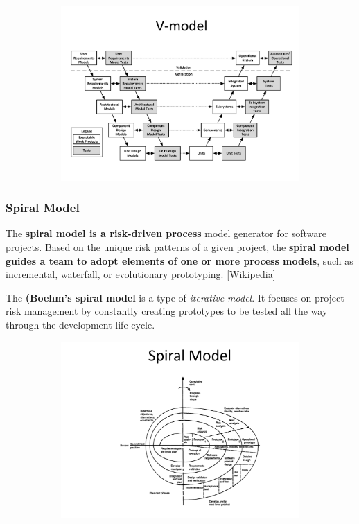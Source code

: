 \documentclass[a4paper]{article}
\begin{document}
\begin{figure}[H]
\hskip-2.5cm\begin{subfigure}{1.2\textwidth}
  \includegraphics[width=1.2\linewidth]
  {images/3-v-model.png}
\end{subfigure}
\end{figure}

\subsubsection{Spiral Model}
The \textbf{spiral model is a risk-driven process} model generator for software projects. Based on the unique risk patterns of a given project, the \textbf{spiral model guides a team to adopt elements of one or more process models}, such as incremental, waterfall, or evolutionary prototyping. [Wikipedia]

The \textbf{(Boehm's spiral model} is a type of \textit{iterative model}. It focuses on project risk management by constantly creating prototypes to be tested all the way through the development life-cycle.

\begin{figure}[H]
\hskip-2.5cm\begin{subfigure}{1.2\textwidth}
  \includegraphics[width=1.2\linewidth]
  {images/3-spiral.png}
\end{subfigure}
\end{figure}
\end{document}

